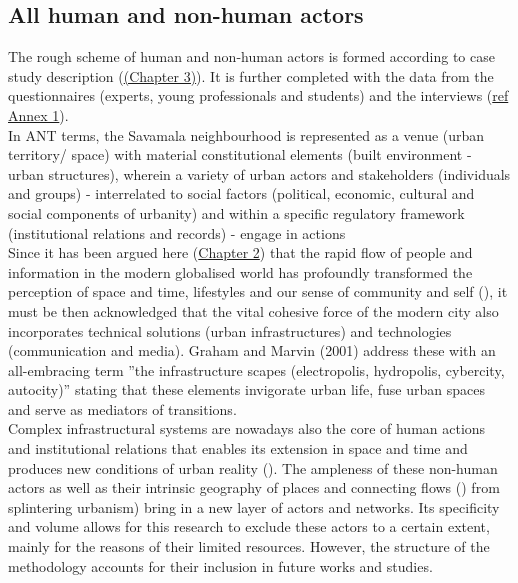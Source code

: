 \documentclass[11pt]{report}
\begin{document}
\subsection{All human and non-human actors}

The rough scheme of human and non-human actors is formed according to case study description
(\href{ref}{(Chapter 3)}). It is further completed with the data from the questionnaires (experts, young professionals and students) and the interviews
(\href{ref}{ref Annex 1}).
\\

In ANT terms, the Savamala neighbourhood is represented as a venue (urban territory/ space) with material constitutional elements (built environment - urban structures), wherein a variety of urban actors and stakeholders (individuals and groups) - interrelated to social factors (political, economic, cultural and social components of urbanity) and within a specific regulatory framework (institutional relations and records) - engage in actions
\\

Since it has been argued here (\href{ref}{Chapter 2}) that the rapid flow of people and information in the modern globalised world has profoundly transformed the perception of space and time, lifestyles and our sense of community and self (\href{Ellin}{\citealt{ellin_postmodern_1999}}), it must be then acknowledged that the vital cohesive force of the modern city also incorporates technical solutions (urban infrastructures) and technologies (communication and media).
Graham and Marvin (2001) address these with an all-embracing term ”the infrastructure scapes (electropolis, hydropolis, cybercity, autocity)” stating that these elements invigorate urban life, fuse urban spaces and serve as mediators of transitions.
\\

Complex infrastructural systems are nowadays also the core of human actions and institutional relations that enables its extension in space and time and produces new conditions of urban reality (\href{Graham}{\citealt{graham_splintering_2001}}).
The ampleness of these non-human actors as well as their intrinsic geography of places and connecting flows (\href{Swyngedouw}{\citealt{NemaRef}}) from splintering urbanism) bring in a new layer of actors and networks. Its specificity and volume allows for this research to exclude these actors to a certain extent, mainly for the reasons of their limited resources. However, the structure of the methodology accounts for their inclusion in future works and studies.
\\
\end{document}
